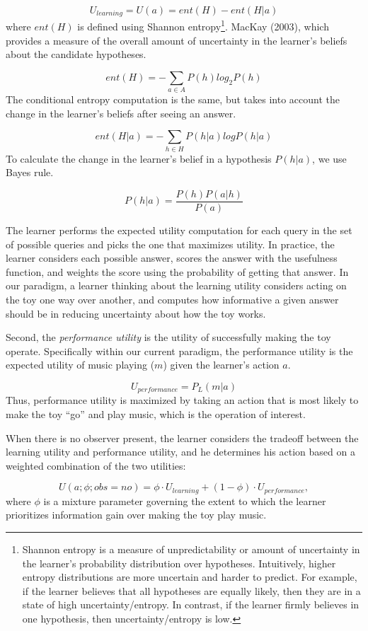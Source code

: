 \documentclass[10pt, letterpaper]{article}
\begin{document}
\[ U_{learning} = U(a) = ent(H) - ent(H|a)\] \noindent
where \(ent(H)\) is defined using Shannon
entropy\footnote{Shannon entropy is a measure of unpredictability or amount of uncertainty in the learner's probability distribution over hypotheses. Intuitively, higher entropy distributions are more uncertain and harder to predict. For example, if the learner believes that all hypotheses are equally likely, then they are in a state of high uncertainty/entropy. In contrast, if the learner firmly believes in one hypothesis, then uncertainty/entropy is low.}.
MacKay (2003), which provides a measure of the overall amount of
uncertainty in the learner's beliefs about the candidate hypotheses.

\[ent(H) = -\sum_{a\in A}{P(h)log_2P(h)}\] \noindent
The conditional entropy computation is the same, but takes into account
the change in the learner's beliefs after seeing an answer.

\[ ent(H|a) = -\sum_{h\in H}{P(h|a)logP(h|a)} \] \noindent
To calculate the change in the learner's belief in a hypothesis
\(P(h|a)\), we use Bayes rule.

\[ P(h|a) = \frac{P(h)P(a|h)}{P(a)} \]

\noindent
The learner performs the expected utility computation for each query in
the set of possible queries and picks the one that maximizes utility. In
practice, the learner considers each possible answer, scores the answer
with the usefulness function, and weights the score using the
probability of getting that answer. In our paradigm, a learner thinking
about the learning utility considers acting on the toy one way over
another, and computes how informative a given answer should be in
reducing uncertainty about how the toy works.

Second, the \emph{performance utility} is the utility of successfully
making the toy operate. Specifically within our current paradigm, the
performance utility is the expected utility of music playing (\(m\))
given the learner's action \(a\).

\[ U_{performance} = P_L(m | a) \] \noindent
Thus, performance utility is maximized by taking an action that is most
likely to make the toy ``go'' and play music, which is the operation of
interest.

When there is no observer present, the learner considers the tradeoff
between the learning utility and performance utility, and he determines
his action based on a weighted combination of the two utilities:

\[ U(a;\phi; obs = no) = \phi \cdot U_{learning} + (1-\phi) \cdot U_{performance} ,\]
\noindent
where \(\phi\) is a mixture parameter governing the extent to which the
learner prioritizes information gain over making the toy play music.
\end{document}
